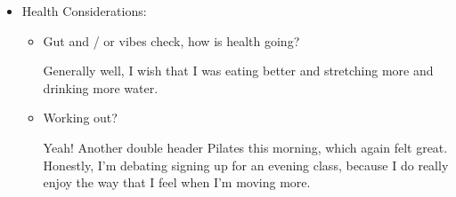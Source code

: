 \documentclass[12pt]{article}
\newcommand{\say}[1]{``#1''}
\renewcommand{\,}{\textsuperscript{,}}
\begin{document}
\begin{itemize}
\begin{itemize}
\begin{itemize}
Lots of the major styles (blackwork and Assisi, for example) base a lot on single stitch design. Why don't we try some of that?   
 \end{itemize}  

 \item Other:  
 \begin{itemize}  
 \item Vibe Check: how goes other creation?

Generally fine! Didn't do anything yesterday, but that was mostly because I wasn't feeling super in the mood to do things?

\item Crochet?

Nope! May do some tonight, because I'll be at the bar I like again, but I might also make a point to use the time for embroidery work.  
Hard to say for sure.

\item Anything else?

Don't think so!  
I guess that cleaning and cooking could count, but I've just been enjoying the leftovers of my punch from housewarming\footnote{note to self, I can absolutely just freeze the remainder, and I'll do that after this reflection}

\end{itemize}  
 \item Upon reflection, how is creation going?

Upon reflection, creating is going well! I'm doing some making, some consuming, and I might want to rename that question to \say{how is creat\textbf{ive work} going}, but that's something for the future.  
 \end{itemize}  
   
 \item Health Considerations:  
 \begin{itemize}  
 \item Gut and / or vibes check, how is health going?

Generally well, I wish that I was eating better and stretching more and drinking more water.

\item Working out?

Yeah! Another double header Pilates this morning, which again felt great.  
Honestly, I'm debating signing up for an evening class, because I do really enjoy the way that I feel when I'm moving more.


\end{itemize}
\end{itemize}
\end{document}
